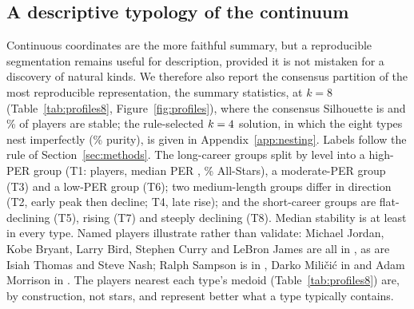 \begin{table}[t]\centering\small
\caption{Shape-only consensus groups ($k=\shapeK$; resampled trajectory minus the player's own mean, length excluded), ordered by median peak position; medians per group.}
\label{tab:shape}
\resizebox{\textwidth}{!}{}
\end{table}

\subsection{A descriptive typology of the continuum}\label{sec:profiles}

Continuous coordinates are the more faithful summary, but a reproducible segmentation remains useful for description, provided it is not mistaken for a discovery of natural kinds. We therefore also report the consensus partition of the most reproducible representation, the summary statistics, at $k=8$ (Table~\ref{tab:profiles8}, Figure~\ref{fig:profiles}), where the consensus Silhouette is \summSilEight{} and \summStableEight\% of players are stable; the rule-selected $k=4$ solution, in which the eight types nest imperfectly (\nestingPurity\% purity), is given in Appendix~\ref{app:nesting}. Labels follow the rule of Section~\ref{sec:methods}. The long-career groups split by level into a high-PER group (T1: \eightNA{} players, median PER \eightPerA, \eightASA\% All-Stars), a moderate-PER group (T3) and a low-PER group (T6); two medium-length groups differ in direction (T2, early peak then decline; T4, late rise); and the short-career groups are flat-declining (T5), rising (T7) and steeply declining (T8). Median stability is at least \eightStabMin{} in every type. Named players illustrate rather than validate: Michael Jordan, Kobe Bryant, Larry Bird, Stephen Curry and LeBron James are all in \typeJordan, as are Isiah Thomas and Steve Nash; Ralph Sampson is in \typeSampson, Darko Mili\v{c}i\'c in \typeMilicic{} and Adam Morrison in \typeMorrison. The players nearest each type's medoid (Table~\ref{tab:profiles8}) are, by construction, not stars, and represent better what a type typically contains.

\begin{table}[t]\centering\scriptsize
\caption{Fine types ($k=8$) of the summary-statistic consensus, ordered by median career-mean PER and length. Labels follow the fixed rule (level: $>18$ high, 12--18 moderate, $<12$ low; duration: $\ge10$ long, 5--9 medium, $\le4$ short; slope qualifier if $|\text{slope}|>0.25$ PER per season).}
\label{tab:profiles8}
\resizebox{\textwidth}{!}{}
\end{table}


